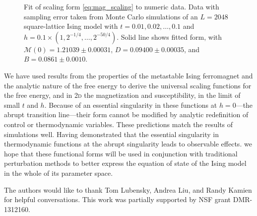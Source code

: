 \documentclass[aps,prl,reprint]{revtex4-1}
\begin{document}
\begin{figure}
  
  \caption{
    Fit of scaling form \eqref{eq:mag_scaling} to numeric data. Data with
    sampling error taken from Monte Carlo simulations of an $L=2048$
    square-lattice Ising model with $t=0.01,0.02,\ldots,0.1$ and
    $h=0.1\times(1,2^{-1/4},\ldots,2^{-50/4})$. Solid line shows fitted form,
    with $\mathcal M(0)=1.21039\pm0.00031$,
    $D=0.09400\pm0.00035$, and $B=0.0861\pm0.0010$.
  }
  \label{fig:mag}
\end{figure}

We have used results from the properties of the metastable Ising ferromagnet
and the analytic nature of the free energy to derive the universal scaling
functions for the free energy, and in \textsc{2d} the magnetization and
susceptibility, in the limit of small $t$ and $h$. Because of an essential
singularity in these functions at $h=0$---the abrupt transition line---their
form cannot be modified by analytic redefinition of control or thermodynamic
variables. These predictions match the results of simulations well. Having
demonstrated that the essential singularity in thermodynamic functions at the
abrupt singularity leads to observable effects. we hope that these functional
forms will be used in conjunction with traditional perturbation methods to
better express the equation of state of the Ising model in the whole of its
parameter space.

\begin{acknowledgments}
  The authors would like to thank Tom Lubensky, Andrea Liu, and Randy Kamien
  for helpful conversations. This work was partially supported by NSF grant
  DMR-1312160.
\end{acknowledgments}


\end{document}
